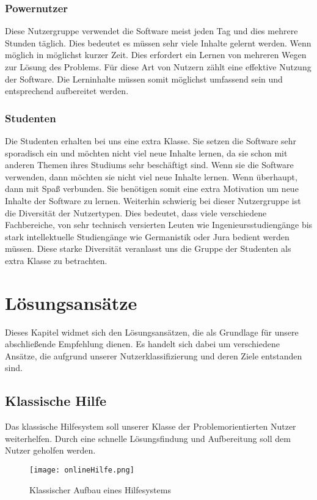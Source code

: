\subsection{Powernutzer}
Diese Nutzergruppe verwendet die Software meist jeden Tag und dies mehrere Stunden täglich. Dies bedeutet es müssen sehr viele Inhalte gelernt werden. Wenn möglich in möglichst kurzer Zeit. Dies erfordert ein Lernen von mehreren Wegen zur Lösung des Problems. Für diese Art von Nutzern zählt eine effektive Nutzung der Software. Die Lerninhalte müssen somit möglichst umfassend sein und entsprechend aufbereitet werden. 
\subsection{Studenten}
Die Studenten erhalten bei uns eine extra Klasse. Sie setzen die Software sehr sporadisch ein und möchten nicht viel neue Inhalte lernen, da sie schon mit anderen Themen ihres Studiums sehr beschäftigt sind. Wenn sie die Software verwenden, dann möchten sie nicht viel neue Inhalte lernen. Wenn überhaupt, dann mit Spaß verbunden. Sie benötigen somit eine extra Motivation um neue Inhalte der Software zu lernen. Weiterhin schwierig bei dieser Nutzergruppe ist die Diversität der Nutzertypen. Dies bedeutet, dass viele verschiedene Fachbereiche, von sehr technisch versierten Leuten wie Ingenieursstudiengänge bis stark intellektuelle Studiengänge wie Germanistik oder Jura bedient werden müssen. Diese starke Diversität veranlasst uns die Gruppe der Studenten als extra Klasse zu betrachten. 



\chapter{Lösungsansätze}
Dieses Kapitel widmet sich den Lösungsansätzen, die als Grundlage für unsere abschließende Empfehlung dienen. Es handelt sich dabei um verschiedene Ansätze, die aufgrund unserer Nutzerklassifizierung und deren Ziele entstanden sind.
\section{Klassische Hilfe}
Das klassische Hilfesystem soll unserer Klasse der Problemorientierten Nutzer weiterhelfen. Durch eine schnelle Lösungsfindung und Aufbereitung soll dem Nutzer geholfen werden.

\begin{figure}[ht]
\begin{center}
\texttt{[image: onlineHilfe.png]}
\caption{Klassischer Aufbau eines Hilfesystems}
\label{img1:userRoles}
\end{center}
\end{figure} 
